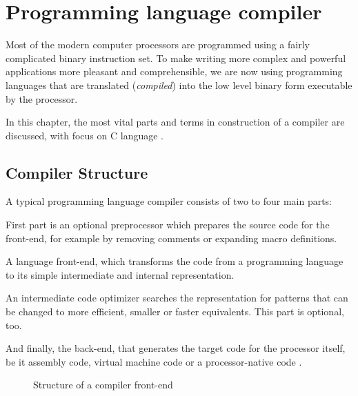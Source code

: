 \chapter{Programming language compiler}\label{theory}

Most of the modern computer processors are programmed using a fairly complicated binary instruction set. To make writing more complex and powerful applications more pleasant and comprehensible, we are now using programming languages that are translated (\emph{compiled}) into the low level binary form executable by the processor.

In this chapter, the most vital parts and terms in construction of a compiler are discussed, with focus on C language \cite{DragonBook}.

    \section{Compiler Structure}

    A typical programming language compiler consists of two to four main parts:

    First part is an optional preprocessor which prepares the source code for the front-end, for example by removing comments or expanding macro definitions.

    A language front-end, which transforms the code from a programming language to its simple intermediate and internal representation.

    An intermediate code optimizer searches the representation for patterns that can be changed to more efficient, smaller or faster equivalents. This part is optional, too.

    And finally, the back-end, that generates the target code for the processor itself, be it assembly code, virtual machine code or a processor-native code \cite{DragonBook}.

    \begin{figure}[H]
    \centering
    \caption{Structure of a compiler front-end} \label{fig:compiler}
    \end{figure}

